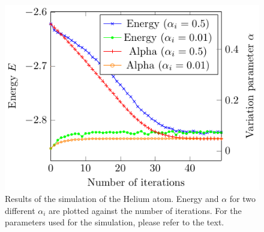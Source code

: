 \begin{figure}[th]
  \begin{center}
  \includegraphics[scale=1 ]{graphs/he-e-alpha-iterations.pdf}
  \caption{
	Results of the simulation of the Helium atom. Energy and $\alpha$ for two different $\alpha_i$ are plotted against the number of iterations. For the parameters used for the simulation, please refer to the text.
  	}
  \label{fig:He_it}
  \end{center}
\end{figure}
